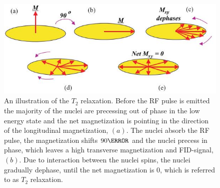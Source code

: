 \begin{figure}[H]                 
	\includegraphics[width=.76\textwidth]{figures/aBackground/T2_relax}  
	\caption{An illustration of the $T_2$ relaxation. Before the RF pulse is emitted the majority of the nuclei are precessing out of phase in the low energy state and the net magnetization is pointing in the direction of the longitudinal magnetization, $(a)$. The nuclei absorb the RF pulse, the magnetization shifts $90 \degree$ and the nuclei precess in phase, which leaves a high transverse magnetization and FID-signal, $(b)$. Due to interaction between the nuclei spins, the nuclei gradually dephase, until the net magnetization is 0, which is referred to as $T_2$ relaxation. \cite{Bharath2008}}
	\label{fig:back:T2_relax} 
\end{figure}

